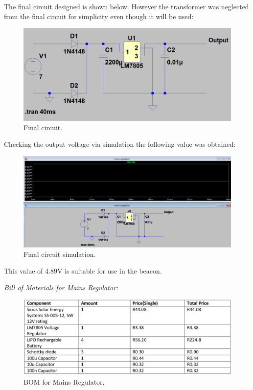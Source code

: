 The final circuit designed is shown below. However the transformer was neglected from the final
circuit for simplicity even though it will be used:
\begin{figure}[H]
\begin{center}
\includegraphics[scale=0.3]{data/power/7.png}
\caption{Final circuit.}
\label{fig:pow-7}
\end{center}
\end{figure}
Checking the output voltage via simulation the following value was obtained:
\begin{figure}[H]
\begin{center}
\includegraphics[scale=0.3]{data/power/8.png}
\caption{Final circuit simulation.}
\label{fig:pow-8}
\end{center}
\end{figure}
This value of 4.89V is suitable for use in the beacon.

\newpage
\textit{Bill of Materials for Mains Regulator:}

\begin{figure}[H]
\begin{center}
\includegraphics[scale=0.3]{data/power/tb2.png}
\caption{BOM for Mains Regulator.}
\label{fig:pow-BOM2}
\end{center}
\end{figure}

